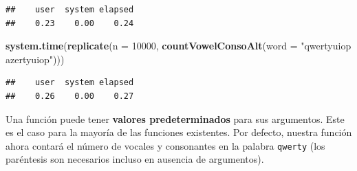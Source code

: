 \documentclass[
]{book}
\newenvironment{Shaded}{\begin{snugshade}}{\end{snugshade}}
\newcommand{\CommentTok}[1]{\textcolor[rgb]{0.56,0.35,0.01}{\textit{#1}}}
\newcommand{\ControlFlowTok}[1]{\textcolor[rgb]{0.13,0.29,0.53}{\textbf{#1}}}
\newcommand{\DataTypeTok}[1]{\textcolor[rgb]{0.13,0.29,0.53}{#1}}
\newcommand{\DecValTok}[1]{\textcolor[rgb]{0.00,0.00,0.81}{#1}}
\newcommand{\KeywordTok}[1]{\textcolor[rgb]{0.13,0.29,0.53}{\textbf{#1}}}
\newcommand{\NormalTok}[1]{#1}
\newcommand{\OperatorTok}[1]{\textcolor[rgb]{0.81,0.36,0.00}{\textbf{#1}}}
\newcommand{\StringTok}[1]{\textcolor[rgb]{0.31,0.60,0.02}{#1}}
\begin{document}
\begin{verbatim}
##    user  system elapsed 
##    0.23    0.00    0.24
\end{verbatim}

\begin{Shaded}
\begin{Highlighting}[]
\KeywordTok{system.time}\NormalTok{(}\KeywordTok{replicate}\NormalTok{(}\DataTypeTok{n =} \DecValTok{10000}\NormalTok{, }\KeywordTok{countVowelConsoAlt}\NormalTok{(}\DataTypeTok{word =} \StringTok{"qwertyuiop azertyuiop"}\NormalTok{)))}
\end{Highlighting}
\end{Shaded}

\begin{verbatim}
##    user  system elapsed 
##    0.26    0.00    0.27
\end{verbatim}

Una función puede tener \textbf{valores predeterminados} para sus argumentos. Este es el caso para la mayoría de las funciones existentes. Por defecto, nuestra función ahora contará el número de vocales y consonantes en la palabra \texttt{qwerty} (los paréntesis son necesarios incluso en ausencia de argumentos).

\begin{Shaded}
\end{Shaded}
\end{document}
